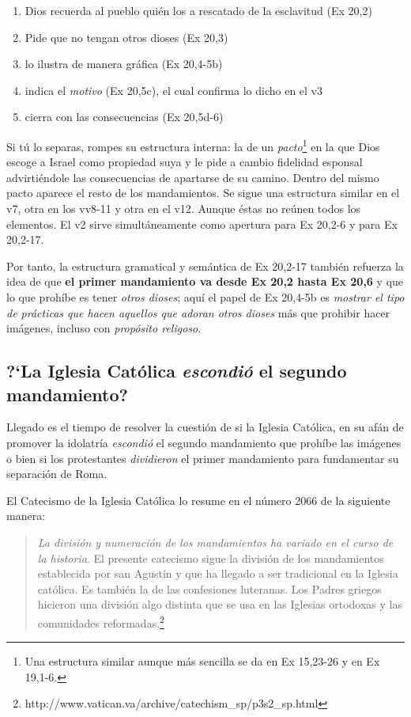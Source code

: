 \documentclass{article}
\begin{document}
\begin{enumerate}
\item Dios recuerda al pueblo qui\'en los a rescatado de la esclavitud (Ex 20,2)
\item Pide que no tengan otros dioses (Ex 20,3)
\item lo ilustra de manera gr\'afica (Ex 20,4-5b)
\item indica el \emph{motivo} (Ex 20,5c), el cual confirma lo dicho en el v3
\item cierra con las consecuencias (Ex 20,5d-6)
\end{enumerate}

\noindent
Si t\'u lo separas, rompes su estructura interna: la de un \emph{pacto}\footnote{Una estructura similar aunque m\'as sencilla se da en Ex 15,23-26 y en Ex 19,1-6.} en la que Dios escoge a Israel como propiedad suya y le pide a cambio fidelidad esponsal advirti\'endole las consecuencias de apartarse de su camino. Dentro del mismo pacto aparece el resto de los mandamientos. Se sigue una estructura similar en el v7, otra en los vv8-11 y otra en el v12. Aunque \'estas no re\'unen todos los elementos. El v2 sirve simult\'aneamente como apertura para Ex 20,2-6 y para Ex 20,2-17.

Por tanto, la estructura gramatical y sem\'antica de Ex 20,2-17 tambi\'en refuerza la idea de que \textbf{el primer mandamiento va desde Ex 20,2 hasta Ex 20,6} y que lo que proh\'{i}be es tener \emph{otros dioses}; aqu\'{i} el papel de Ex 20,4-5b es \emph{mostrar el tipo de pr\'acticas que hacen aquellos que adoran otros dioses} m\'as que prohibir hacer im\'agenes, incluso con \emph{prop\'osito religoso}.

\subsection{?`La Iglesia Cat\'olica \emph{escondi\'o} el segundo mandamiento?}

Llegado es el tiempo de resolver la cuesti\'on de si la Iglesia Cat\'olica, en su af\'an de promover la idolatr\'{i}a \emph{escondi\'o} el segundo mandamiento que proh\'{i}be las im\'agenes o bien si los protestantes \emph{dividieron} el primer mandamiento para fundamentar su separaci\'on de Roma.

El Catecismo de la Iglesia Cat\'olica lo resume en el n\'umero 2066 de la siguiente manera:

\begin{quote}
\emph{La división y numeración de los mandamientos ha variado en el curso de la historia}. El presente catecismo sigue la división de los mandamientos establecida por san Agustín y que ha llegado a ser tradicional en la Iglesia católica. Es también la de las confesiones luteranas. Los Padres griegos hicieron una división algo distinta que se usa en las Iglesias ortodoxas y las comunidades reformadas.\footnote{http://www.vatican.va/archive/catechism\_sp/p3s2\_sp.html}
\end{quote}
\end{document}
